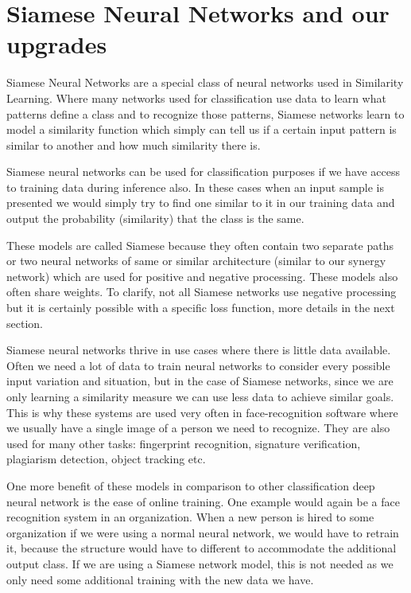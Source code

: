 \documentclass[b5paper]{book}
\begin{document}

\chapter{Siamese Neural Networks and our upgrades}

Siamese Neural Networks are a special class of neural networks used in Similarity Learning. Where many networks used for classification use data to learn what patterns define a class and to recognize those patterns, Siamese networks learn to model a similarity function which simply can tell us if a certain input pattern is similar to another and how much similarity there is.

Siamese neural networks can be used for classification purposes if we have access to training data during inference also. In these cases when an input sample is presented we would simply try to find one similar to it in our training data and output the probability (similarity) that the class is the same. 

These models are called Siamese because they often contain two separate paths or two neural networks of same or similar architecture (similar to our synergy network) which are used for positive and negative processing. These models also often share weights. To clarify, not all Siamese networks use negative processing but it is certainly possible with a specific loss function, more details in the next section.

Siamese neural networks thrive in use cases where there is little data available. Often we need a lot of data to train neural networks to consider every possible input variation and situation, but in the case of Siamese networks, since we are only learning a similarity measure we can use less data to achieve similar goals. This is why these systems are used very often in face-recognition software where we usually have a single image of a person we need to recognize. They are also used for many other tasks: fingerprint recognition, signature verification, plagiarism detection, object tracking etc.

One more benefit of these models in comparison to other classification deep neural network is the ease of online training. One example would again be a face recognition system in an organization. When a new person is hired to some organization if we were using a normal neural network, we would have to retrain it, because the structure would have to different to accommodate the additional output class. If we are using a Siamese network model, this is not needed as we only need some additional training with the new data we have. 
\end{document}
